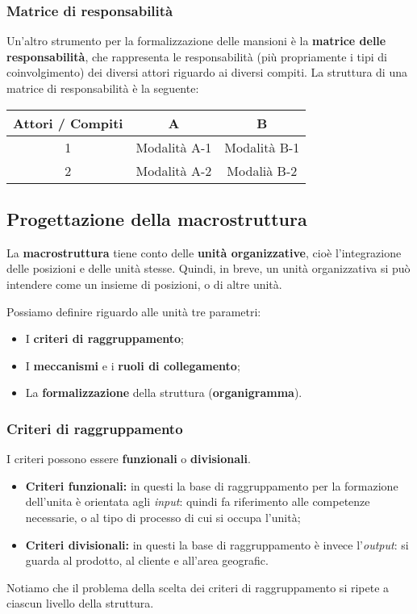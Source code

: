 \documentclass[a4paper,11pt]{article}
\begin{document}
\subsubsection{Matrice di responsabilità}
Un'altro strumento per la formalizzazione delle mansioni è la \textbf{matrice delle responsabilità}, che rappresenta le responsabilità (più propriamente i tipi di coinvolgimento) dei diversi attori riguardo ai diversi compiti.
La struttura di una matrice di responsabilità è la seguente:
\begin{table}[h!]
	\center {}
	\begin{tabular} {  c | c c }
		\bfseries Attori / Compiti & A & B \\
		\hline 
		1 & Modalità A-1 & Modalità B-1 \\ 
		2 & Modalità A-2 & Modalià B-2
	\end{tabular}
\end{table}

\subsection{Progettazione della macrostruttura}
La \textbf{macrostruttura} tiene conto delle \textbf{unità organizzative}, cioè l'integrazione delle posizioni e delle unità stesse.
Quindi, in breve, un unità organizzativa si può intendere come un insieme di posizioni, o di altre unità.

Possiamo definire riguardo alle unità tre parametri:
\begin{itemize}
	\item I \textbf{criteri di raggruppamento};
	\item I \textbf{meccanismi} e i \textbf{ruoli di collegamento};
	\item La \textbf{formalizzazione} della struttura (\textbf{organigramma}).
\end{itemize}

\subsubsection{Criteri di raggruppamento}
I criteri possono essere \textbf{funzionali} o \textbf{divisionali}.
\begin{itemize}
	\item \textbf{Criteri funzionali:} in questi la base di raggruppamento per la formazione dell'unita è orientata agli \textit{input}: quindi fa riferimento  alle competenze necessarie, o al tipo di processo di cui si occupa l'unità;
	\item \textbf{Criteri divisionali:} in questi la base di raggruppamento è invece l'\textit{output}: si guarda al prodotto, al cliente e all'area geografic.
\end{itemize}
Notiamo che il problema della scelta dei criteri di raggruppamento si ripete a ciascun livello della struttura.
\end{document}
